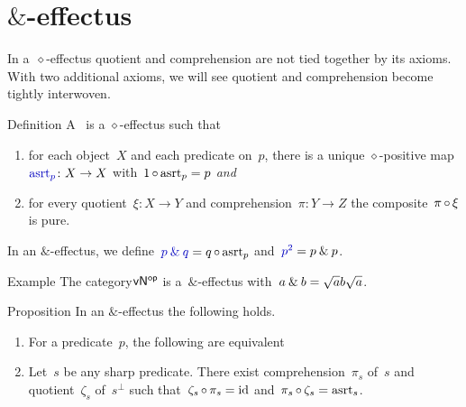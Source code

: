 \documentclass[b]{subfiles}
\begin{document}
\section{$\&$-effectus}
\begin{parsec}%
\begin{point}%
In a~$\diamond$-effectus
    quotient and comprehension are not tied together by its axioms.
    With two additional axioms, we will see quotient and comprehension
    become tightly interwoven. 
\end{point}
\begin{point}{Definition}%
A~
is a $\diamond$-effectus
such that
\begin{enumerate}
\item
    for each object~$X$
    and each predicate on~$p$,
    there is a unique $\diamond$-positive map~$\Define{\asrt_p}\colon X \to X$
    with~$1 \mathop{\circ} \mathrm{asrt}_p = p$ \emph{and}
\item
    for every quotient~$\xi \colon X \to Y$
    and comprehension~$\pi \colon Y \to Z$
    the composite~$\pi \mathop{\circ} \xi$ is pure.
\end{enumerate}
In an $\&$-effectus,
we define~$\Define{\andthen{p}{q}} = q \after \asrt_p$
    and~$\Define{p^2} = \andthen{p}{p}$.
\end{point}
\begin{point}{Example}%
The category${\mathsf{vN}}{^{\mathsf{op}}}$ is a~$\&$-effectus
    with~$a \mathbin{\&} b = \sqrt{a}b\sqrt{a}$. 
\end{point}
\begin{point}{Proposition}%
In an $\&$-effectus
    the following holds.
\begin{enumerate}
\item
For a predicate~$p$,
the following are equivalent
\item
Let~$s$ be any sharp predicate.
There exist comprehension~$\pi_s$ of~$s$
        and quotient~$\zeta_s$ of~$s^\perp$
        such that~$\zeta_s \mathop{\circ} \pi_s = \operatorname{id}$
        and~$\pi_s \mathop{\circ} \zeta_s = \mathrm{asrt}_s$.


\end{enumerate}
\end{point}
\end{parsec}
\end{document}
